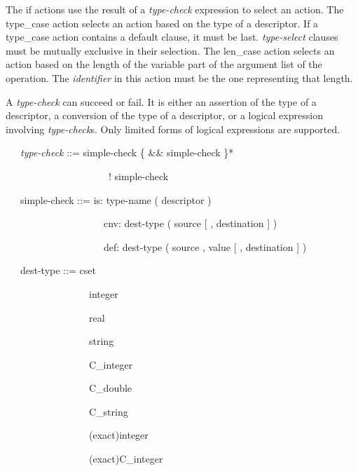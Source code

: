 The if actions use the result of a \textit{type-check} expression to
select an action. The type\_case action selects an action based on the
type of a descriptor. If a type\_case action contains a default
clause, it must be last.  \textit{type-select} clauses must be
mutually exclusive in their selection. The len\_case action selects an
action based on the length of the variable part of the argument list
of the operation. The \textit{identifier} in this action must be the
one representing that length.

A \textit{type-check} can succeed or fail. It is either an assertion
of the type of a descriptor, a conversion of the type of a descriptor,
or a logical expression involving \textit{type-check}s. Only limited
forms of logical expressions are supported.

{\ttfamily\mdseries
\ \ \ \textit{type-check} ::= simple-check \{ \&\& simple-check \}* {\textbar}}

{\ttfamily\mdseries
\ \ \ \ \ \ \ \ \ \ \ \ \ \ \ \ \ \ \ \ \ ! simple-check}


\bigskip

{\ttfamily\mdseries
\ \ \ simple-check ::= is: type-name ( descriptor ) {\textbar}}

{\ttfamily\mdseries
\ \ \ \ \ \ \ \ \ \ \ \ \ \ \ \ \ \ \ \ cnv: dest-type ( source [ , destination ] ) {\textbar}}

{\ttfamily\mdseries
\ \ \ \ \ \ \ \ \ \ \ \ \ \ \ \ \ \ \ \ def: dest-type ( source , value [ , destination ] )}


\bigskip

{\ttfamily\mdseries
\ \ \ dest-type ::= cset {\textbar}}

{\ttfamily\mdseries
\ \ \ \ \ \ \ \ \ \ \ \ \ \ \ \ \ integer {\textbar}}

{\ttfamily\mdseries
\ \ \ \ \ \ \ \ \ \ \ \ \ \ \ \ \ real {\textbar}}

{\ttfamily\mdseries
\ \ \ \ \ \ \ \ \ \ \ \ \ \ \ \ \ string {\textbar}}

{\ttfamily\mdseries
\ \ \ \ \ \ \ \ \ \ \ \ \ \ \ \ \ C\_integer {\textbar}}

{\ttfamily\mdseries
\ \ \ \ \ \ \ \ \ \ \ \ \ \ \ \ \ C\_double {\textbar}}

{\ttfamily\mdseries
\ \ \ \ \ \ \ \ \ \ \ \ \ \ \ \ \ C\_string {\textbar}}

{\ttfamily\mdseries
\ \ \ \ \ \ \ \ \ \ \ \ \ \ \ \ \ (exact)integer {\textbar}}

{\ttfamily\mdseries
\ \ \ \ \ \ \ \ \ \ \ \ \ \ \ \ \ (exact)C\_integer {\textbar}}

